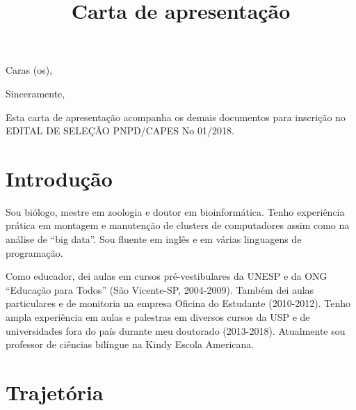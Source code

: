 \documentclass[10pt, a4paper, roman, twoside, top=0cm, bottom=0cm, headheight=0cm, footsep=0cm, footskip=0cm]{moderncv}        %
\title{Carta de apresentação}                               %
\begin{document}
\thispagestyle{empty} %
    \date{}
    \opening{Caras (os),}
    \closing{Sinceramente,}
\makelettertitle
%
%

    Esta carta de apresentação acompanha os demais documentos para inscrição no EDITAL DE SELEÇÃO PNPD/CAPES No 01/2018. 

\vspace{-0.5em}

\section{Introdução}

\vspace{-0.5em}

{\setlength{\parindent}{2ex}
Sou biólogo, mestre em zoologia e doutor em bioinformática. Tenho experiência prática em montagem e manutenção de clusters de computadores assim como na análise de  ``big data''. Sou fluente em inglês e em várias linguagens de programação.

Como educador, dei aulas em cursos pré-vestibulares da UNESP e da ONG ``Educação para Todos'' (São Vicente-SP, 2004-2009). Também dei aulas particulares e de monitoria na empresa Oficina do Estudante (2010-2012). Tenho ampla experiência em aulas e palestras em diversos cursos da USP e de universidades fora do país durante meu doutorado (2013-2018). Atualmente sou professor de ciências bilíngue na Kindy Escola Americana.
}

\vspace{-0.5em}

\section{Trajetória}

\vspace{-0.5em}
\end{document}

